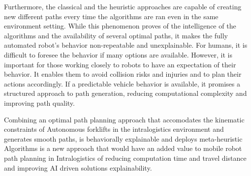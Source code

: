 Furthermore, the classical and the heuristic approaches are capable of creating new different paths every time the 
algorithms are ran even in the same environment setting. While this phenomenon proves of the intelligence of the algorithms
and the availability of several optimal paths, it makes the fully automated robot's behavior non-repeatable and unexplainable. 
For humans, it is difficult to foresee the behavior if many options are available. However, it is important for those working 
closely to robots to have an expectation of their behavior. It enables them to avoid collision risks and injuries and to 
plan their actions accordingly. If a predictable vehicle behavior is available, it promises a structured approach to path 
generation, reducing computational complexity and improving path quality.

Combining an optimal path planning approach that accomodates the kinematic constraints of Autonomous forklifts in the
intralogistics environment and generates smooth paths, is behaviorally explainable and deploys meta-heuristic 
Algorithms is a new approach that would have an added value to mobile robot path planning in Intralogistics of 
reducing computation time and travel distance and improving AI driven solutions explainability. 

